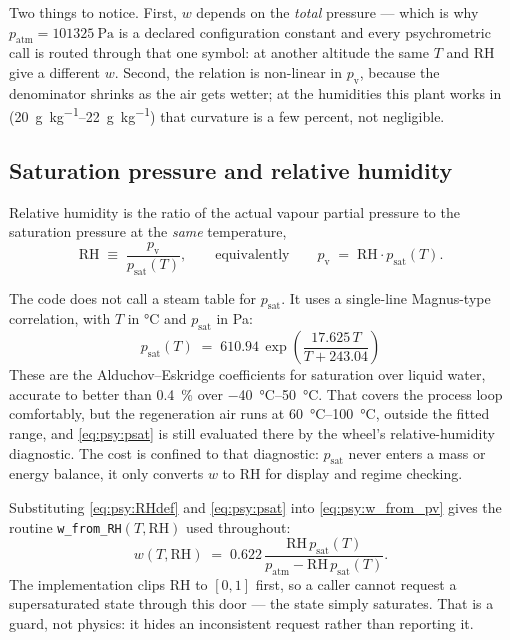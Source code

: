 \documentclass[11pt]{article}
\providecommand{\celsius}{\degreeCelsius}
\newcommand{\patm}{\ensuremath{p_{\mathrm{atm}}}}
\newcommand{\psat}{\ensuremath{p_{\mathrm{sat}}}}
\newcommand{\RH}{\ensuremath{\mathrm{RH}}}
\begin{document}
Two things to notice. First, $w$ depends on the \emph{total} pressure --- which is why $\patm =
\SI{101325}{\pascal}$ is a declared configuration constant and every psychrometric call is routed
through that one symbol: at another altitude the same $T$ and $\RH$ give a different $w$. Second,
the relation is non-linear in $p_{\mathrm{v}}$, because the denominator shrinks as the air gets
wetter; at the humidities this plant works in (\SIrange{20}{22}{\gram\per\kilogram}) that curvature
is a few percent, not negligible.

\subsection{Saturation pressure and relative humidity}
\label{sec:psy:psat}

Relative humidity is the ratio of the actual vapour partial pressure to the saturation pressure at
the \emph{same} temperature,
\begin{equation}
\RH \;\equiv\; \frac{p_{\mathrm{v}}}{\psat(T)} , \qquad\text{equivalently}\qquad
p_{\mathrm{v}} \;=\; \RH \cdot \psat(T) . \label{eq:psy:RHdef}
\end{equation}

The code does not call a steam table for $\psat$. It uses a single-line Magnus-type correlation,
with $T$ in \si{\celsius} and $\psat$ in \si{\pascal}:
\begin{equation}
\boxed{\;\psat(T) \;=\; 610.94\, \exp\!\left(\frac{17.625\,T}{T + 243.04}\right)\;}
\label{eq:psy:psat}
\end{equation}
These are the Alduchov--Eskridge coefficients for saturation over liquid water, accurate to better
than \SI{0.4}{\percent} over \SIrange{-40}{50}{\celsius}. That covers the process loop comfortably,
but the regeneration air runs at \SIrange{60}{100}{\celsius}, outside the fitted range, and
\eqref{eq:psy:psat} is still evaluated there by the wheel's relative-humidity diagnostic. The cost
is confined to that diagnostic: $\psat$ never enters a mass or energy balance, it only converts $w$
to $\RH$ for display and regime checking.

Substituting \eqref{eq:psy:RHdef} and \eqref{eq:psy:psat} into \eqref{eq:psy:w_from_pv} gives the
routine \texttt{w\_from\_RH}$(T,\RH)$ used throughout:
\begin{equation}
w(T,\RH) \;=\; 0.622\,\frac{\RH\,\psat(T)}{\patm - \RH\,\psat(T)} . \label{eq:psy:w_from_RH}
\end{equation}
The implementation clips $\RH$ to $[0,1]$ first, so a caller cannot request a supersaturated state
through this door --- the state simply saturates. That is a guard, not physics: it hides an
inconsistent request rather than reporting it.
\end{document}
